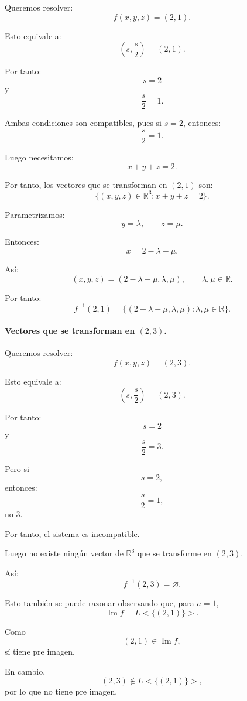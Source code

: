 \documentclass[12pt]{article}
\begin{document}
Queremos resolver:
\[
f(x,y,z)=(2,1).
\]

Esto equivale a:
\[
\left(s,\frac{s}{2}\right)=(2,1).
\]

Por tanto:
\[
s=2
\]
y
\[
\frac{s}{2}=1.
\]

Ambas condiciones son compatibles, pues si \(s=2\), entonces:
\[
\frac{s}{2}=1.
\]

Luego necesitamos:
\[
x+y+z=2.
\]

Por tanto, los vectores que se transforman en \((2,1)\) son:
\[
\{(x,y,z)\in\mathbb{R}^3:x+y+z=2\}.
\]

Parametrizamos:
\[
y=\lambda,
\qquad
z=\mu.
\]

Entonces:
\[
x=2-\lambda-\mu.
\]

Así:
\[
(x,y,z)=(2-\lambda-\mu,\lambda,\mu),
\qquad
\lambda,\mu\in\mathbb{R}.
\]

Por tanto:
\[
\boxed{
f^{-1}(2,1)=\{(2-\lambda-\mu,\lambda,\mu):\lambda,\mu\in\mathbb{R}\}.
}
\]

\paragraph{Vectores que se transforman en \((2,3)\).}

Queremos resolver:
\[
f(x,y,z)=(2,3).
\]

Esto equivale a:
\[
\left(s,\frac{s}{2}\right)=(2,3).
\]

Por tanto:
\[
s=2
\]
y
\[
\frac{s}{2}=3.
\]

Pero si
\[
s=2,
\]
entonces:
\[
\frac{s}{2}=1,
\]
no \(3\).

Por tanto, el sistema es incompatible.

Luego no existe ningún vector de \(\mathbb{R}^3\) que se transforme en \((2,3)\).

Así:
\[
\boxed{
f^{-1}(2,3)=\varnothing.
}
\]

Esto también se puede razonar observando que, para \(a=1\),
\[
\operatorname{Im} f=L<\{(2,1)\}>.
\]

Como
\[
(2,1)\in \operatorname{Im} f,
\]
sí tiene pre imagen.

En cambio,
\[
(2,3)\notin L<\{(2,1)\}>,
\]
por lo que no tiene pre imagen.
\end{document}
